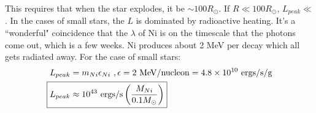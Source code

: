 This requires that when the star explodes, it be $\sim100 R_\odot$. If $R \ll 100R_\odot$, $L_{peak} \ll$. In the cases of small stars, the $L$ is dominated by radioactive heating. It's a ``wonderful" coincidence that the $\lambda$ of Ni is on the timescale that the photons come out, which is a few weeks. Ni produces about 2 MeV per decay which all gets radiated away. For the case of small stars:
\begin{align}
L_{peak} &= m_{Ni} \epsilon_{Ni}~,\epsilon = 2\textrm{ MeV/nucleon}= 4.8 \times 10^{10}\textrm{ ergs/s/g}\\
\Aboxed{L_{peak} &\approx 10^{43} \textrm{ ergs/s}\lp \frac{M_{Ni}}{0.1M_\odot} \rp}
\end{align}
